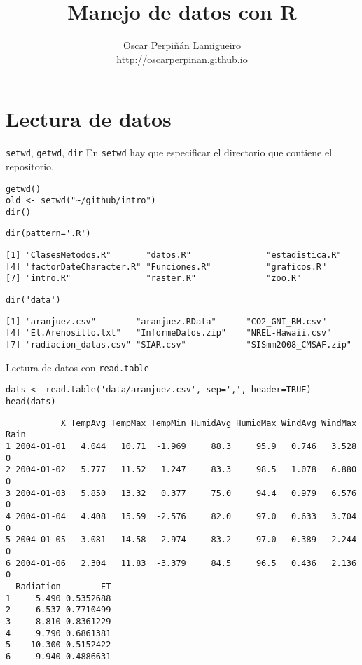 \documentclass[xcolor={usenames,svgnames,dvipsnames}]{beamer}
\author{Oscar Perpiñán Lamigueiro \\ \url{http://oscarperpinan.github.io}}
\date{}
\title{Manejo de datos con R}
\begin{document}
\maketitle

\section{Lectura de datos}
\label{sec-1}
\begin{frame}[fragile,label=sec-1-1]{\texttt{setwd}, \texttt{getwd}, \texttt{dir}}
 En \texttt{setwd} hay que especificar el directorio que contiene el repositorio.
\lstset{language=R,label= ,caption= ,numbers=none}
\begin{lstlisting}
getwd()
old <- setwd("~/github/intro")
dir()
\end{lstlisting}

\lstset{language=R,label= ,caption= ,numbers=none}
\begin{lstlisting}
dir(pattern='.R')
\end{lstlisting}

\begin{verbatim}
[1] "ClasesMetodos.R"       "datos.R"               "estadistica.R"        
[4] "factorDateCharacter.R" "Funciones.R"           "graficos.R"           
[7] "intro.R"               "raster.R"              "zoo.R"
\end{verbatim}

\lstset{language=R,label= ,caption= ,numbers=none}
\begin{lstlisting}
dir('data')
\end{lstlisting}

\begin{verbatim}
[1] "aranjuez.csv"        "aranjuez.RData"      "CO2_GNI_BM.csv"     
[4] "El.Arenosillo.txt"   "InformeDatos.zip"    "NREL-Hawaii.csv"    
[7] "radiacion_datas.csv" "SIAR.csv"            "SISmm2008_CMSAF.zip"
\end{verbatim}
\end{frame}

\begin{frame}[fragile,label=sec-1-2]{Lectura de datos con \texttt{read.table}}
 \lstset{language=R,label= ,caption= ,numbers=none}
\begin{lstlisting}
dats <- read.table('data/aranjuez.csv', sep=',', header=TRUE)
head(dats)
\end{lstlisting}

\begin{verbatim}
           X TempAvg TempMax TempMin HumidAvg HumidMax WindAvg WindMax Rain
1 2004-01-01   4.044   10.71  -1.969     88.3     95.9   0.746   3.528    0
2 2004-01-02   5.777   11.52   1.247     83.3     98.5   1.078   6.880    0
3 2004-01-03   5.850   13.32   0.377     75.0     94.4   0.979   6.576    0
4 2004-01-04   4.408   15.59  -2.576     82.0     97.0   0.633   3.704    0
5 2004-01-05   3.081   14.58  -2.974     83.2     97.0   0.389   2.244    0
6 2004-01-06   2.304   11.83  -3.379     84.5     96.5   0.436   2.136    0
  Radiation        ET
1     5.490 0.5352688
2     6.537 0.7710499
3     8.810 0.8361229
4     9.790 0.6861381
5    10.300 0.5152422
6     9.940 0.4886631
\end{verbatim}
\end{frame}
\end{document}
